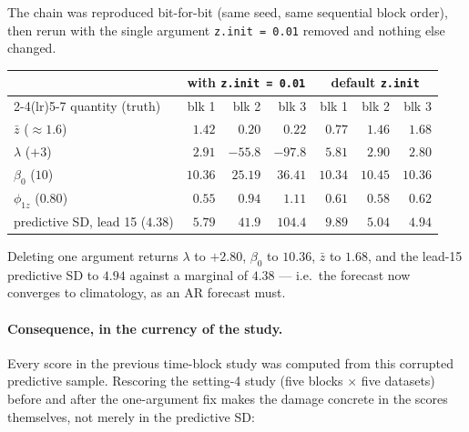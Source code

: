 \documentclass[11pt]{article}
\newcommand{\code}[1]{\texttt{#1}}
\begin{document}
The chain was reproduced bit-for-bit (same seed, same sequential block order),
then rerun with the single argument \code{z.init = 0.01} removed and nothing
else changed.

\begin{center}
\begin{tabular}{lrrrrrr}
\toprule
& \multicolumn{3}{c}{\textbf{with} \code{z.init = 0.01}} & \multicolumn{3}{c}{\textbf{default} \code{z.init}} \\
\cmidrule(lr){2-4}\cmidrule(lr){5-7}
quantity (truth) & blk 1 & blk 2 & blk 3 & blk 1 & blk 2 & blk 3 \\
\midrule
$\bar z$ \hfill($\approx 1.6$)      & $1.42$ & $0.20$ & $0.22$ & $0.77$ & $1.46$ & $\mathbf{1.68}$ \\
$\lambda$ \hfill($+3$)              & $2.91$ & $-55.8$ & $-97.8$ & $5.81$ & $2.90$ & $\mathbf{2.80}$ \\
$\beta_0$ \hfill($10$)              & $10.36$ & $25.19$ & $36.41$ & $10.34$ & $10.45$ & $\mathbf{10.36}$ \\
$\phi_{1z}$ \hfill($0.80$)          & $0.55$ & $0.94$ & $1.11$ & $0.61$ & $0.58$ & $\mathbf{0.62}$ \\
\midrule
predictive SD, lead 15 \hfill($4.38$) & $5.79$ & $\mathbf{41.9}$ & $\mathbf{104.4}$ & $9.89$ & $5.04$ & $\mathbf{4.94}$ \\
\bottomrule
\end{tabular}
\end{center}

Deleting one argument returns $\lambda$ to $+2.80$, $\beta_0$ to $10.36$, $\bar
z$ to $1.68$, and the lead-15 predictive SD to $4.94$ against a marginal of
$4.38$ --- i.e.\ the forecast now converges to climatology, as an AR forecast
must.

\paragraph{Consequence, in the currency of the study.} Every score in the
previous time-block study was computed from this corrupted predictive sample.
Rescoring the setting-4 study (five blocks $\times$ five datasets) before and
after the one-argument fix makes the damage concrete in the scores themselves,
not merely in the predictive SD:
\end{document}
